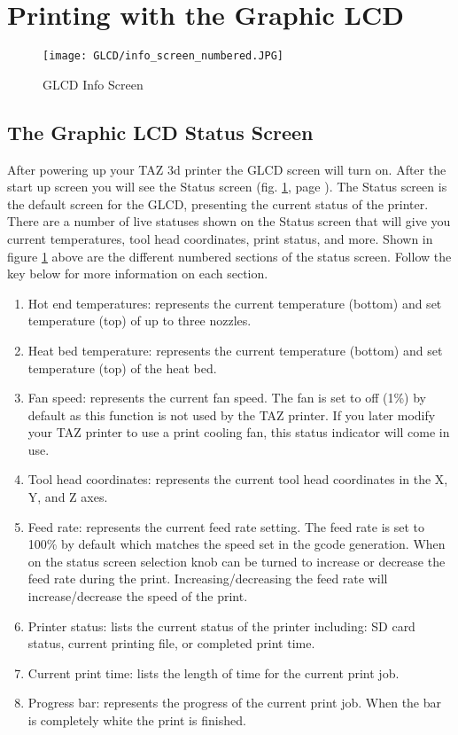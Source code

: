 \section{Printing with the Graphic LCD}
\begin{figure}[b]
\centering
\texttt{[image: GLCD/info\_screen\_numbered.JPG]}
\caption{GLCD Info Screen}
\label{fig:info_screen}
\end{figure}

\subsection{The Graphic LCD Status Screen}
After powering up your TAZ 3d printer the GLCD screen will turn on. After the start up screen you will see the Status screen (fig. \ref{fig:info_screen}, page \pageref{fig:info_screen}). The Status screen is the default screen for the GLCD, presenting the current status of the printer. There are a number of live statuses shown on the Status screen that will give you current temperatures, tool head coordinates, print status, and more. Shown in figure \ref{fig:info_screen} above are the different numbered sections of the status screen. Follow the key below for more information on each section.

\begin{enumerate}
\item Hot end temperatures: represents the current temperature (bottom) and set temperature (top) of up to three nozzles.
\item Heat bed temperature: represents the current temperature (bottom) and set temperature (top) of the heat bed.
\item Fan speed: represents the current fan speed. The fan is set to off (1\%) by default as this function is not used by the TAZ printer. If you later modify your TAZ printer to use a print cooling fan, this status indicator will come in use.
\item Tool head coordinates: represents the current tool head coordinates in the X, Y, and Z axes.
\item Feed rate: represents the current feed rate setting. The feed rate is set to 100\% by default which matches the speed set in the gcode generation. When on the status screen selection knob can be turned to increase or decrease the feed rate during the print. Increasing/decreasing the feed rate will increase/decrease the speed of the print.
\item Printer status: lists the current status of the printer including: SD card status, current printing file, or completed print time.
\item Current print time: lists the length of time for the current print job.
\item Progress bar: represents the progress of the current print job. When the bar is completely white the print is finished.
\end{enumerate}



